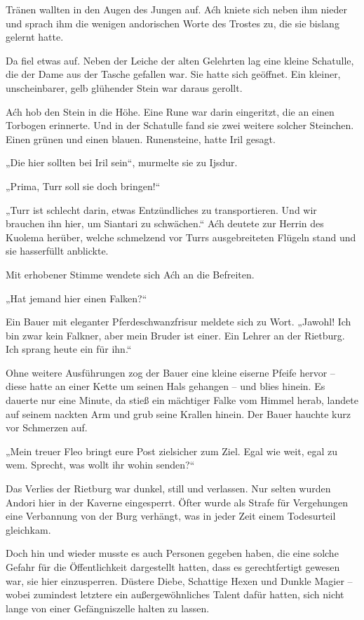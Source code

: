 Tränen wallten in den Augen des Jungen auf. Aćh kniete sich neben ihm nieder und sprach ihm die wenigen andorischen Worte des Trostes zu, die sie bislang gelernt hatte.

Da fiel etwas auf. Neben der Leiche der alten Gelehrten lag eine kleine Schatulle, die der Dame aus der Tasche gefallen war. Sie hatte sich geöffnet. Ein kleiner, unscheinbarer, gelb glühender Stein war daraus gerollt.

Aćh hob den Stein in die Höhe. Eine Rune war darin eingeritzt, die an einen Torbogen erinnerte. Und in der Schatulle fand sie zwei weitere solcher Steinchen. Einen grünen und einen blauen. Runensteine, hatte Iril gesagt.

„Die hier sollten bei Iril sein“, murmelte sie zu Ijsdur.

„Prima, Turr soll sie doch bringen!“

„Turr ist schlecht darin, etwas Entzündliches zu transportieren. Und wir brauchen ihn hier, um Siantari zu schwächen.“ Aćh deutete zur Herrin des Kuolema herüber, welche schmelzend vor Turrs ausgebreiteten Flügeln stand und sie hasserfüllt anblickte.

Mit erhobener Stimme wendete sich Aćh an die Befreiten.

„Hat jemand hier einen Falken?“

Ein Bauer mit eleganter Pferdeschwanzfrisur meldete sich zu Wort. „Jawohl! Ich bin zwar kein Falkner, aber mein Bruder ist einer. Ein Lehrer an der Rietburg. Ich sprang heute ein für ihn.“

Ohne weitere Ausführungen zog der Bauer eine kleine eiserne Pfeife hervor – diese hatte an einer Kette um seinen Hals gehangen – und blies hinein. Es dauerte nur eine Minute, da stieß ein mächtiger Falke vom Himmel herab, landete auf seinem nackten Arm und grub seine Krallen hinein. Der Bauer hauchte kurz vor Schmerzen auf.

„Mein treuer Fleo bringt eure Post zielsicher zum Ziel. Egal wie weit, egal zu wem. Sprecht, was wollt ihr wohin senden?“



\trennzeichen



Das Verlies der Rietburg war dunkel, still und verlassen. Nur selten wurden Andori hier in der Kaverne eingesperrt. Öfter wurde als Strafe für Vergehungen eine Verbannung von der Burg verhängt, was in jeder Zeit einem Todesurteil gleichkam.

Doch hin und wieder musste es auch Personen gegeben haben, die eine solche Gefahr für die Öffentlichkeit dargestellt hatten, dass es gerechtfertigt gewesen war, sie hier einzusperren. Düstere Diebe, Schattige Hexen und Dunkle Magier – wobei zumindest letztere ein außergewöhnliches Talent dafür hatten, sich nicht lange von einer Gefängniszelle halten zu lassen.

